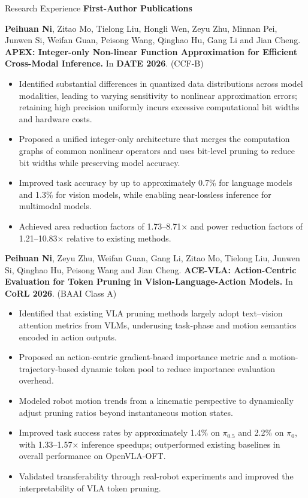 \documentclass{resume}
\newenvironment{publicationentry}{\begin{list}{}{\setlength{\leftmargin}{0.6em}\setlength{\rightmargin}{0em}\setlength{\topsep}{3pt}\setlength{\partopsep}{0pt}\setlength{\parsep}{0pt}\setlength{\itemsep}{0pt}}\item[]}{\end{list}}
\begin{document}
\begin{rSection}{Research Experience}
\textbf{First-Author Publications}
\begin{publicationentry}
\textbf{Peihuan Ni}, Zitao Mo, Tielong Liu, Hongli Wen, Zeyu Zhu, Minnan Pei, Junwen Si, Weifan Guan, Peisong Wang, Qinghao Hu, Gang Li and Jian Cheng.
\textbf{APEX: Integer-only Non-linear Function Approximation for Efficient Cross-Modal Inference.}
In \textbf{DATE 2026}. (CCF-B)
\begin{itemize}
\item Identified substantial differences in quantized data distributions across model modalities, leading to varying sensitivity to nonlinear approximation errors; retaining high precision uniformly incurs excessive computational bit widths and hardware costs.
\item Proposed a unified integer-only architecture that merges the computation graphs of common nonlinear operators and uses bit-level pruning to reduce bit widths while preserving model accuracy.
\item Improved task accuracy by up to approximately 0.7\% for language models and 1.3\% for vision models, while enabling near-lossless inference for multimodal models.
\item Achieved area reduction factors of 1.73--8.71$\times$ and power reduction factors of 1.21--10.83$\times$ relative to existing methods.
\end{itemize}
\end{publicationentry}
\begin{publicationentry}
\textbf{Peihuan Ni}, Zeyu Zhu, Weifan Guan, Gang Li, Zitao Mo, Tielong Liu, Junwen Si, Qinghao Hu, Peisong Wang and Jian Cheng.
\textbf{ACE-VLA: Action-Centric Evaluation for Token Pruning in Vision-Language-Action Models.}
In \textbf{CoRL 2026}. (BAAI Class A)
\begin{itemize}
\item Identified that existing VLA pruning methods largely adopt text--vision attention metrics from VLMs, underusing task-phase and motion semantics encoded in action outputs.
\item Proposed an action-centric gradient-based importance metric and a motion-trajectory-based dynamic token pool to reduce importance evaluation overhead.
\item Modeled robot motion trends from a kinematic perspective to dynamically adjust pruning ratios beyond instantaneous motion states.
\item Improved task success rates by approximately 1.4\% on $\pi_{0.5}$ and 2.2\% on $\pi_0$, with 1.33--1.57$\times$ inference speedups; outperformed existing baselines in overall performance on OpenVLA-OFT.
\item Validated transferability through real-robot experiments and improved the interpretability of VLA token pruning.
\end{itemize}
\end{publicationentry}


\end{rSection}
\end{document}
